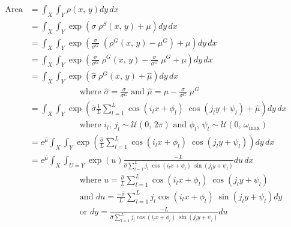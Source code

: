 \documentclass[12pt,dvipsnames]{report}
\begin{document}
\begin{align}
\text{Area} &= \int_X \int_Y \rho\left( x,\, y \right) dy \, dx \\
&= \int_X \int_Y \exp\left( \sigma \; \rho^S \left( x,\, y \right) + \mu \right) dy \, dx \\
&= \int_X \int_Y \exp\left( \frac{\sigma}{\sigma^G} \; \left( \rho^G\left( x,\, y \right) - \mu^G \right) + \mu \right) dy \, dx \\
&= \int_X \int_Y \exp\left( \frac{\sigma}{\sigma^G} \; \rho^G\left( x,\, y \right) - \frac{\sigma}{\sigma^G} \; \mu^G + \mu \right) dy \, dx \\
&= \int_X \int_Y \exp\left( \hat{\sigma} \; \rho^G\left( x,\, y \right) + \hat{\mu} \right) dy \, dx \\
& \hspace{1in} \text{where $\hat{\sigma} = \frac{\sigma}{\sigma^G}$ and $\hat{\mu} = \mu - \frac{\sigma}{\sigma^G} \; \mu^G$} \nonumber \\
&= \int_X \int_Y \exp\left( \hat{\sigma} \frac{1}{L} \sum_{l = 1}^L \cos\left( i_l x + \phi_l \right) \; \cos\left( j_l y + \psi_l \right) + \hat{\mu} \right) dy \, dx \\
& \hspace{1in} \text{where $i_l,\, j_l \sim \mathcal{U}\left( 0,\, 2\pi \right)$ and $\phi_l,\, \psi_l \sim \mathcal{U}\left( 0,\, \omega_{\max} \right)$} \nonumber \\
&= e^{\hat{\mu}} \int_X \int_Y \exp\left( \frac{\hat{\sigma}}{L} \sum_{l=1}^L \cos\left( i_l x + \phi_l \right) \; \cos\left( j_l y + \psi_l \right) \right) dy \, dx \\
&= e^{\hat{\mu}} \int_X \int_{U=Y} \exp\left( u \right) \frac{-L}{\hat{\sigma} \sum_{l=1}^L j_l \; \cos\left( i_l x + \phi_l \right) \; \sin\left( j_l y + \psi_l \right)} du \, dx \\
& \hspace{1in} \text{where $u = \frac{\hat{\sigma}}{L} \sum_{l=1}^L \cos\left( i_l x + \phi_l \right) \; \cos\left( j_l y + \psi_l \right)$} \nonumber \\
& \hspace{1in} \text{and $du = \frac{-\hat{\sigma}}{L} \sum_{l=1}^L j_l \cos\left( i_l x + \phi_l \right) \; \sin\left( j_l y + \psi_l \right) dy$} \nonumber \\
& \hspace{1in} \text{or $dy = \frac{-L}{\hat{\sigma} \sum_{l=1}^L j_l \cos\left( i_l x + \phi_l \right) \; \sin\left( j_l y + \psi_l \right)} du$} \nonumber \\

\end{align}
\end{document}
